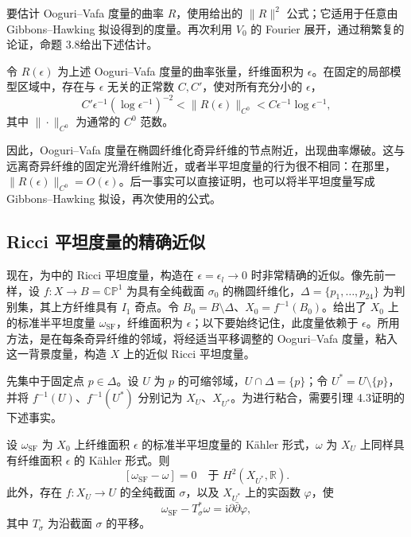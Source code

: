 要估计 Ooguri--Vafa 度量的曲率 $R$，使用给出的 $\|R\|^2$ 公式；它适用于任意由 Gibbons--Hawking 拟设得到的度量。再次利用 $V_0$ 的 Fourier 展开，通过稍繁复的论证，命题 3.8给出下述估计。
\begin{proposition}\label{prop:7.28}
令 $R(\epsilon)$ 为上述 Ooguri--Vafa 度量的曲率张量，纤维面积为 $\epsilon$。在固定的局部模型区域中，存在与 $\epsilon$ 无关的正常数 $C,C'$，使对所有充分小的 $\epsilon$，
\[
C'\epsilon^{-1}(\log\epsilon^{-1})^{-2}
<\|R(\epsilon)\|_{C^0}
<C\epsilon^{-1}\log\epsilon^{-1},
\]
其中 $\|\cdot\|_{C^0}$ 为通常的 $C^0$ 范数。
\end{proposition}

因此，Ooguri--Vafa 度量在椭圆纤维化奇异纤维的节点附近，出现曲率爆破。这与远离奇异纤维的固定光滑纤维附近，或者半平坦度量的行为很不相同：在那里，$\|R(\epsilon)\|_{C^0}=O(\epsilon)$。后一事实可以直接证明，也可以将半平坦度量写成 Gibbons--Hawking 拟设，再次使用的公式。

\subsection{Ricci 平坦度量的精确近似}\label{sec:7.3.5}

现在，为中的 Ricci 平坦度量，构造在 $\epsilon=\epsilon_l\to0$ 时非常精确的近似。像先前一样，设 $f\colon X\to B=\mathbb{CP}^1$ 为具有全纯截面 $\sigma_0$ 的椭圆纤维化，$\Delta=\{p_1,\ldots,p_{24}\}$ 为判别集，其上方纤维具有 $I_1$ 奇点。令 $B_0=B\setminus\Delta$、$X_0=f^{-1}(B_0)$。给出了 $X_0$ 上的标准半平坦度量 $\omega_{\mathrm{SF}}$，纤维面积为 $\epsilon$；以下要始终记住，此度量依赖于 $\epsilon$。所用方法，是在每条奇异纤维的邻域，将经适当平移调整的 Ooguri--Vafa 度量，粘入这一背景度量，构造 $X$ 上的近似 Ricci 平坦度量。

先集中于固定点 $p\in\Delta$。设 $U$ 为 $p$ 的可缩邻域，$U\cap\Delta=\{p\}$；令 $U^*=U\setminus\{p\}$，并将 $f^{-1}(U)$、$f^{-1}(U^*)$ 分别记为 $X_U$、$X_{U^*}$。为进行粘合，需要引理 4.3证明的下述事实。

\begin{lemma}\label{lem:7.29}
设 $\omega_{\mathrm{SF}}$ 为 $X_0$ 上纤维面积 $\epsilon$ 的标准半平坦度量的 Kähler 形式，$\omega$ 为 $X_U$ 上同样具有纤维面积 $\epsilon$ 的 Kähler 形式。则
\[
[\omega_{\mathrm{SF}}-\omega]=0\quad\text{于 }H^2(X_{U^*},\mathbb R).
\]
此外，存在 $f\colon X_U\to U$ 的全纯截面 $\sigma$，以及 $X_{U^*}$ 上的实函数 $\varphi$，使
\[
\omega_{\mathrm{SF}}-T_\sigma^*\omega
=\mathrm i\partial\bar\partial\varphi,
\]
其中 $T_\sigma$ 为沿截面 $\sigma$ 的平移。
\end{lemma}

